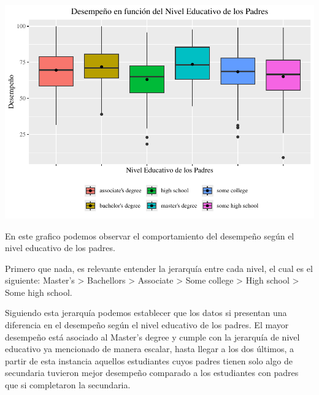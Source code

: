 \documentclass[
]{article}
\begin{document}
\begin{center}\includegraphics{Trabajo-Grupo-6.-Students-performance_files/figure-latex/grafico1-1} \end{center}

En este grafico podemos observar el comportamiento del desempeño según
el nivel educativo de los padres.

Primero que nada, es relevante entender la jerarquía entre cada nivel,
el cual es el siguiente: Master's \textgreater{} Bachellors
\textgreater{} Associate \textgreater{} Some college \textgreater{} High
school \textgreater{} Some high school.

Siguiendo esta jerarquía podemos establecer que los datos si presentan
una diferencia en el desempeño según el nivel educativo de los padres.
El mayor desempeño está asociado al Master's degree y cumple con la
jerarquía de nivel educativo ya mencionado de manera escalar, hasta
llegar a los dos últimos, a partir de esta instancia aquellos
estudiantes cuyos padres tienen solo algo de secundaria tuvieron mejor
desempeño comparado a los estudiantes con padres que si completaron la
secundaria.
\end{document}

